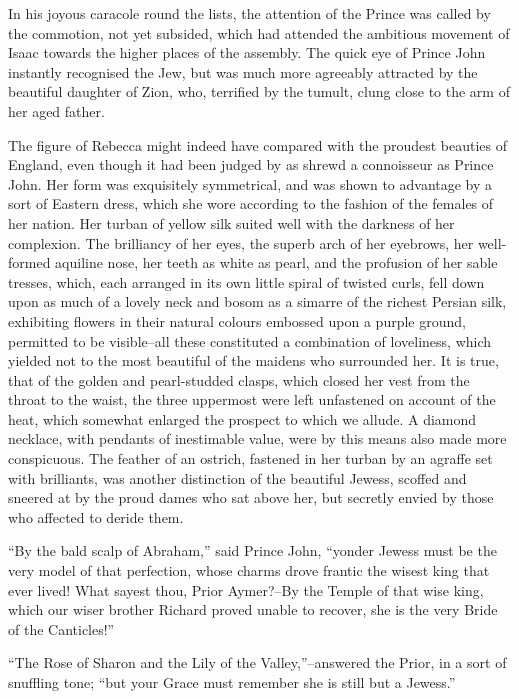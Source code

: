 In his joyous caracole round the lists, the attention of the Prince was
called by the commotion, not yet subsided, which had attended the
ambitious movement of Isaac towards the higher places of the assembly.
The quick eye of Prince John instantly recognised the Jew, but was much
more agreeably attracted by the beautiful daughter of Zion, who,
terrified by the tumult, clung close to the arm of her aged father.

The figure of Rebecca might indeed have compared with the proudest
beauties of England, even though it had been judged by as shrewd a
connoisseur as Prince John. Her form was exquisitely symmetrical, and
was shown to advantage by a sort of Eastern dress, which she wore
according to the fashion of the females of her nation. Her turban of
yellow silk suited well with the darkness of her complexion. The
brilliancy of her eyes, the superb arch of her eyebrows, her well-formed
aquiline nose, her teeth as white as pearl, and the profusion of her
sable tresses, which, each arranged in its own little spiral of twisted
curls, fell down upon as much of a lovely neck and bosom as a simarre of
the richest Persian silk, exhibiting flowers in their natural colours
embossed upon a purple ground, permitted to be visible--all these
constituted a combination of loveliness, which yielded not to the most
beautiful of the maidens who surrounded her. It is true, that of the
golden and pearl-studded clasps, which closed her vest from the throat
to the waist, the three uppermost were left unfastened on account of the
heat, which somewhat enlarged the prospect to which we allude. A diamond
necklace, with pendants of inestimable value, were by this means also
made more conspicuous. The feather of an ostrich, fastened in her turban
by an agraffe set with brilliants, was another distinction of the
beautiful Jewess, scoffed and sneered at by the proud dames who sat
above her, but secretly envied by those who affected to deride them.

``By the bald scalp of Abraham,'' said Prince John, ``yonder Jewess must
be the very model of that perfection, whose charms drove frantic the
wisest king that ever lived! What sayest thou, Prior Aymer?--By the
Temple of that wise king, which our wiser brother Richard proved unable
to recover, she is the very Bride of the Canticles!''

``The Rose of Sharon and the Lily of the Valley,''--answered the Prior,
in a sort of snuffling tone; ``but your Grace must remember she is still
but a Jewess.''

